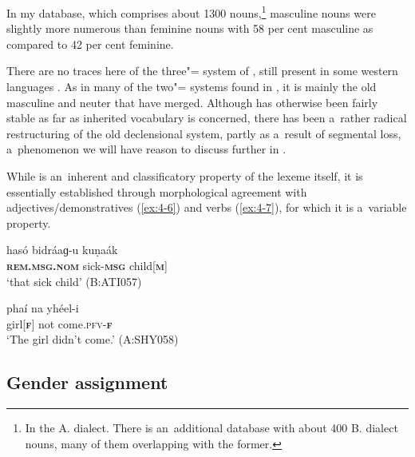 In my database, which comprises about 1300 nouns,\footnote{In the A. dialect. There is an~additional database with about 400 B. dialect nouns, many of them overlapping with the former.} masculine nouns were slightly more numerous than feminine nouns with 58 per cent masculine as compared to 42 per cent feminine.


There are no traces here of the three"= system of , still present in some western  languages \citep[220--221]{masica1991}. As in many of the two"= systems found in , it is mainly the old masculine and neuter that have merged. Although  has otherwise been fairly stable as far as inherited vocabulary is concerned, there has been a~rather radical restructuring of the old declensional system, partly as a~result of segmental loss, a~phenomenon we will have reason to discuss further in .


While  is an~inherent and classificatory property of the  lexeme itself, it is essentially established through morphological agreement with adjectives/demonstratives (\ref{ex:4-6}) and verbs (\ref{ex:4-7}), for which it is a~variable property. 


\begin{exe}
\ex
\label{ex:4-6}
\gll hasó bidráaɡ-u kuṇaák \\
	\textbf{\textsc{rem.msg.nom}} sick-\textbf{\textsc{msg}} child[\textbf{\textsc{m}}] \\
\glt `that sick child' (B:ATI057)
\end{exe}

\begin{exe}
\ex
\label{ex:4-7}
\gll phaí na yhéel-i \\
	girl[\textbf{\textsc{f}}] not come.\textsc{pfv-\textbf{\textsc{f}}} \\
\glt `The girl didn't come.' (A:SHY058)
\end{exe}

\subsection{Gender assignment}
\label{subsec:4-3-1}


